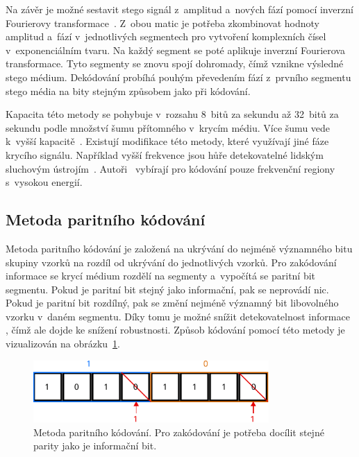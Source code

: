 \noindent Na závěr je možné sestavit stego signál z~amplitud a~nových fází
pomocí inverzní Fourierovy transformace~\cite{Bender1996}. Z~obou matic je
potřeba zkombinovat hodnoty amplitud a~fází v~jednotlivých segmentech pro
vytvoření komplexních čísel v~exponenciálním tvaru. Na každý segment se poté
aplikuje inverzní Fourierova transformace. Tyto segmenty se znovu spojí
dohromady, čímž vznikne výsledné stego médium. Dekódování probíhá pouhým
převedením fází z~prvního segmentu stego média na bity stejným způsobem jako
při kódování.

Kapacita této metody se pohybuje v~rozsahu 8~bitů za sekundu až 32~bitů za
sekundu podle množství šumu přítomného v~krycím médiu. Více šumu vede k~vyšší
kapacitě~\cite{Bender1996}. Existují modifikace této metody, které využívají
jiné fáze krycího signálu. Například vyšší frekvence jsou hůře detekovatelné
lidským sluchovým ústrojím~\cite{Djebbar2014}. Autoři~\cite{Djebbar2014}
vybírají pro kódování pouze frekvenční regiony s~vysokou energií.

\subsection*{Metoda paritního kódování}
\label{sub:parity-coding}

Metoda paritního kódování je založená na ukrývání do nejméně významného bitu
skupiny vzorků na rozdíl od ukrývání do jednotlivých vzorků. Pro zakódování
informace se krycí médium rozdělí na segmenty a~vypočítá se paritní bit
segmentu. Pokud je paritní bit stejný jako informační, pak se neprovádí nic.
Pokud je paritní bit rozdílný, pak se změní nejméně významný bit libovolného
vzorku v~daném segmentu. Díky tomu je možné snížit detekovatelnost informace
\cite{Bandyopadhyay2008}, čímž ale dojde ke snížení robustnosti. Způsob
kódování pomocí této metody je vizualizován na obrázku~\ref{pic:parity-coding}.

\begin{figure}[hbt]
    \centering
    \includegraphics[width=0.8\textwidth]{obrazky/parity-coding.pdf}
    \caption{Metoda paritního kódování. Pro zakódování je potřeba docílit
    stejné parity jako je informační bit.}
    \label{pic:parity-coding}
\end{figure}


